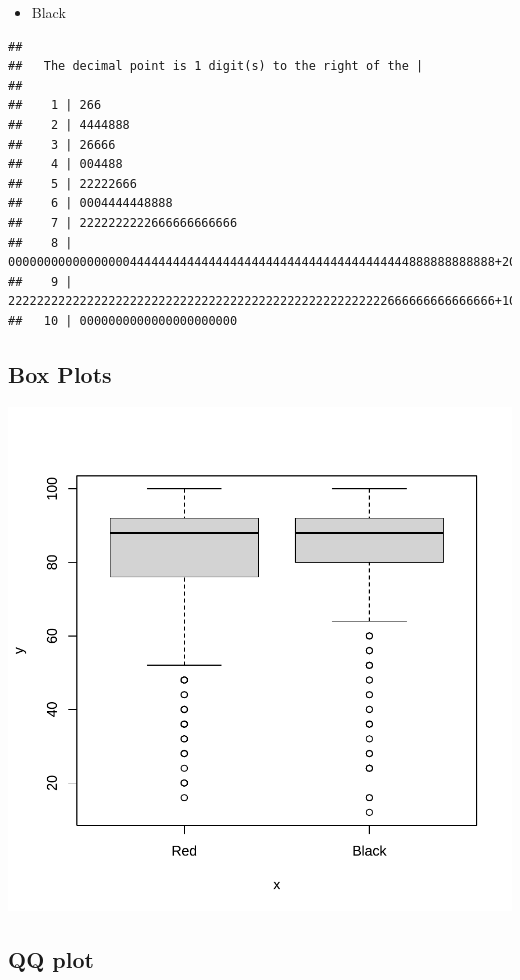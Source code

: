 \documentclass[
]{book}
\providecommand{\tightlist}{%
  \setlength{\itemsep}{0pt}\setlength{\parskip}{0pt}}
\begin{document}
\begin{itemize}
\tightlist
\item
  Black
\end{itemize}

\begin{verbatim}
## 
##   The decimal point is 1 digit(s) to the right of the |
## 
##    1 | 266
##    2 | 4444888
##    3 | 26666
##    4 | 004488
##    5 | 22222666
##    6 | 0004444448888
##    7 | 2222222222666666666666
##    8 | 00000000000000000444444444444444444444444444444444444444888888888888+20
##    9 | 22222222222222222222222222222222222222222222222222222666666666666666+10
##   10 | 0000000000000000000000
\end{verbatim}

\subsection{Box Plots}\label{box-plots}

\includegraphics{_main_files/figure-latex/boxplots-1.pdf}

\subsection{QQ plot}\label{qq-plot}
\end{document}
